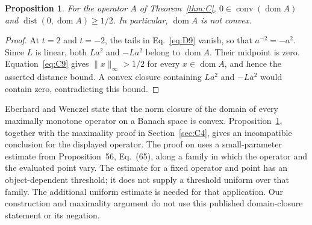\documentclass[11pt]{article}
\newcommand{\dom}{\operatorname{dom}}
\newtheorem{proposition}{Proposition}
\begin{document}
\begin{proposition}\label{prop:domain-gap}
For the operator $A$ of Theorem~\ref{thm:C},
$0\in\operatorname{conv}(\dom A)$ and
$\operatorname{dist}(0,\dom A)\ge1/2$.
In particular, $\overline{\dom A}$ is not convex.
\end{proposition}
\begin{proof}
At $t=2$ and $t=-2$, the tails in Eq.~\eqref{eq:D9} vanish, so that
$a^{-2}=-a^2$. Since $L$ is linear, both $La^2$ and $-La^2$ belong
to $\dom A$. Their midpoint is zero. Equation~\eqref{eq:C9} gives
$\|x\|_\infty>1/2$ for every $x\in\dom A$, and hence the asserted
distance bound. A convex closure containing $La^2$ and $-La^2$ would
contain zero, contradicting this bound.
\end{proof}

Eberhard and Wenczel \cite[Theorem~57]{eberhardwenczel2024} state that
the norm closure of the domain of every maximally monotone operator on
a Banach space is convex. Proposition~\ref{prop:domain-gap}, together
with the maximality proof in Section~\ref{sec:C4}, gives an incompatible
conclusion for the displayed operator. The proof on
\cite[pp.~39--40]{eberhardwenczel2024} uses a small-parameter estimate
from Proposition~56, Eq.~(65), along a family in which the operator and
the evaluated point vary. The estimate for a fixed operator and point
has an object-dependent threshold; it does not supply a threshold
uniform over that family. The additional uniform estimate is needed
for that application. Our construction and maximality argument do not
use this published domain-closure statement or its negation.
\end{document}
